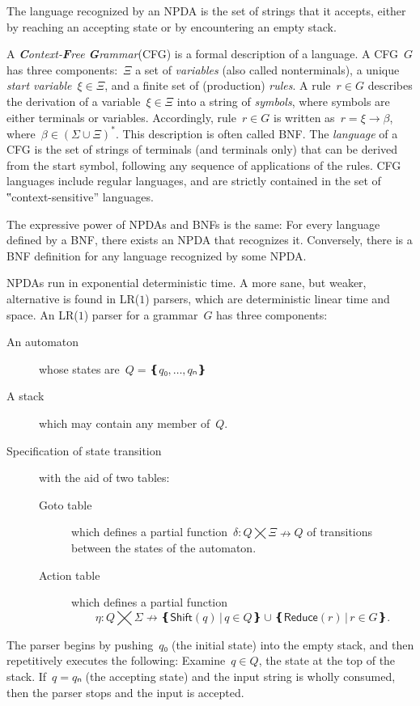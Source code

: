 The language recognized by an NPDA is the set of strings that it accepts,
  either by reaching an accepting state or by encountering an empty stack.

A \emph{\textbf Context-\textbf Free \textbf Grammar}(CFG) is a formal description of a language.
A CFG~$G$ has three components:~$Ξ$ a set of \emph{variables} (also called nonterminals), %
  a unique \emph{start variable}~$ξ∈Ξ$, and a finite set of (production) \emph{rules}.
A rule~$r∈G$ describes the derivation of a variable~$ξ∈Ξ$ into
  a string of \emph{symbols}, where symbols are either terminals or variables.
Accordingly, rule~$r∈G$ is written as~$r=ξ→β$, where~$β∈\left(Σ∪Ξ\right)^*$.
This description is often called BNF\@.
The \emph{language} of a CFG is the set of strings of terminals (and terminals only)
  that can be derived from the start symbol, following any sequence of applications of the rules.
CFG languages include regular languages, and are strictly contained in the set
  of ‟context-sensitive” languages.

The expressive power of NPDAs and BNFs is the same:
  For every language defined by a BNF, there exists an NPDA that recognizes it.
Conversely, there is a BNF definition for any language recognized by some NPDA.

NPDAs run in exponential deterministic time.
A more sane, but weaker, alternative is found in LR($1$) parsers,
  which are deterministic linear time and space.
An LR($1$) parser for a grammar~$G$ has three components:
\begin{description}
  \item[An automaton] whose states are~$Q=❴q₀,…,qₙ❵$
  \item[A stack] which may contain any member of~$Q$.
  \item[Specification of state transition] with the aid of two tables:
        \begin{description}
          \item[Goto table] which defines a partial function~$δ:Q⨉Ξ↛Q$ of transitions
          between the states of the automaton.
          \item[Action table] which
            defines a partial function\[η:Q⨉Σ↛ ❴ \textsf{Shift}(q) \,|\, q∈Q❵ ∪ ❴\textsf{Reduce}(r) \,| \, r∈G❵.\]
        \end{description}
\end{description}
The parser begins by pushing~$q₀$ (the initial state) into the empty stack,
and then repetitively executes the following:
Examine~$q∈Q$, the state at the top of the stack.
If~$q=qₙ$ (the accepting state) and the input string is wholly consumed, then the parser stops and the input is accepted.

